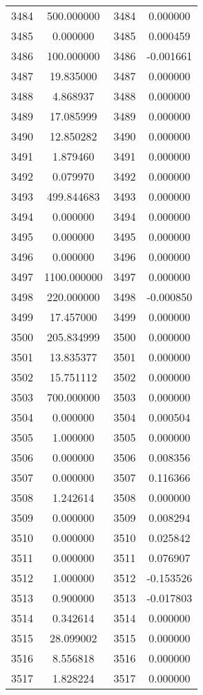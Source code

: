 \documentclass[12pt]{article}
\begin{document}
\begin{longtable}{@{}cccc@{}}
3484 & 500.000000 & 3484 & 0.000000 \\
3485 & 0.000000 & 3485 & 0.000459 \\
3486 & 100.000000 & 3486 & -0.001661 \\
3487 & 19.835000 & 3487 & 0.000000 \\
3488 & 4.868937 & 3488 & 0.000000 \\
3489 & 17.085999 & 3489 & 0.000000 \\
3490 & 12.850282 & 3490 & 0.000000 \\
3491 & 1.879460 & 3491 & 0.000000 \\
3492 & 0.079970 & 3492 & 0.000000 \\
3493 & 499.844683 & 3493 & 0.000000 \\
3494 & 0.000000 & 3494 & 0.000000 \\
3495 & 0.000000 & 3495 & 0.000000 \\
3496 & 0.000000 & 3496 & 0.000000 \\
3497 & 1100.000000 & 3497 & 0.000000 \\
3498 & 220.000000 & 3498 & -0.000850 \\
3499 & 17.457000 & 3499 & 0.000000 \\
3500 & 205.834999 & 3500 & 0.000000 \\
3501 & 13.835377 & 3501 & 0.000000 \\
3502 & 15.751112 & 3502 & 0.000000 \\
3503 & 700.000000 & 3503 & 0.000000 \\
3504 & 0.000000 & 3504 & 0.000504 \\
3505 & 1.000000 & 3505 & 0.000000 \\
3506 & 0.000000 & 3506 & 0.008356 \\
3507 & 0.000000 & 3507 & 0.116366 \\
3508 & 1.242614 & 3508 & 0.000000 \\
3509 & 0.000000 & 3509 & 0.008294 \\
3510 & 0.000000 & 3510 & 0.025842 \\
3511 & 0.000000 & 3511 & 0.076907 \\
3512 & 1.000000 & 3512 & -0.153526 \\
3513 & 0.900000 & 3513 & -0.017803 \\
3514 & 0.342614 & 3514 & 0.000000 \\
3515 & 28.099002 & 3515 & 0.000000 \\
3516 & 8.556818 & 3516 & 0.000000 \\
3517 & 1.828224 & 3517 & 0.000000 \\

\end{longtable}
\end{document}
